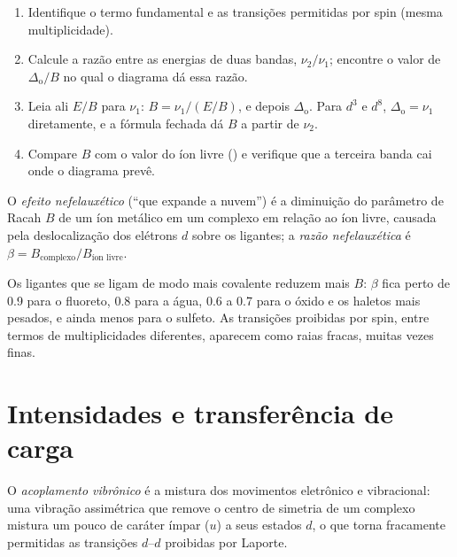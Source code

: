 \begin{method}\label{met:b3:complex-spectra-magnetism:read-ts}
\begin{enumerate}
  \item Identifique o termo fundamental e as transições permitidas por spin (mesma
        multiplicidade).
  \item Calcule a razão entre as energias de duas bandas, $\nu_2/\nu_1$; encontre o valor de
        $\Delta_{\mathrm o}/B$ no qual o diagrama dá essa razão.
  \item Leia ali $E/B$ para $\nu_1$: $B = \nu_1/(E/B)$, e depois $\Delta_{\mathrm o}$. Para $d^3$ e $d^8$, $\Delta_{\mathrm o} = \nu_1$
        diretamente, e a fórmula fechada dá $B$ a partir de $\nu_2$.
  \item Compare $B$ com o valor do íon livre () e verifique que a
        terceira banda cai onde o diagrama prevê.
\end{enumerate}
\end{method}

\begin{definition}\label{def:b3:complex-spectra-magnetism:nephelauxetic}
O \emph{efeito nefelauxético} (``que expande a nuvem'') é a
diminuição do parâmetro de Racah $B$ de um íon metálico em um complexo em relação ao
íon livre, causada pela deslocalização dos elétrons $d$ sobre os ligantes; a
\emph{razão nefelauxética} é $\beta =
B_{\text{complexo}}/B_{\text{íon livre}}$.
\end{definition}

Os ligantes que se ligam de modo mais covalente reduzem mais $B$: $\beta$ fica perto de
0.9 para o fluoreto, 0.8 para a água, 0.6 a 0.7 para o óxido e os haletos mais
pesados, e ainda menos para o sulfeto. As transições proibidas por spin, entre termos
de multiplicidades diferentes, aparecem como raias fracas, muitas vezes finas.

\section{Intensidades e transferência de carga}

\begin{definition}\label{def:b3:complex-spectra-magnetism:vibronic-coupling}
O \emph{acoplamento vibrônico} é a mistura dos movimentos
eletrônico e vibracional: uma vibração assimétrica que remove o centro de simetria
de um complexo mistura um pouco de caráter ímpar ($u$) a seus estados $d$, o que torna
fracamente permitidas as transições $d$--$d$ proibidas por Laporte.
\end{definition}

